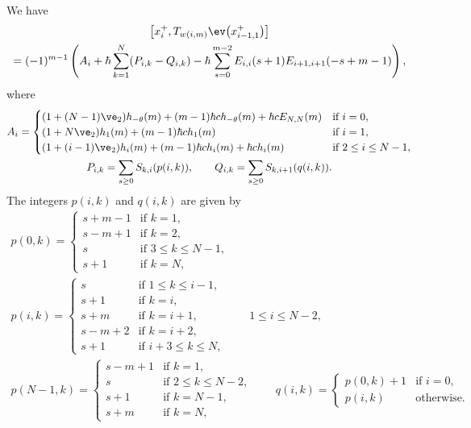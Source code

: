 \begin{prop}\label{prop:braket}
We have
\begin{gather}
\big[x_i^+, T_{w(i,m)} \ev\big(x_{i-1,1}^+\big)\big] \nonumber\\
= (-1)^{m-1} \left(A_i + \hbar \sum_{k=1}^N (P_{i,k}-Q_{i,k}) - \hbar \sum_{s=0}^{m-2} E_{i,i}(s+1)E_{i+1,i+1}(-s+m-1) \right),\label{eq:braket}
\end{gather}
where
\begin{gather*}
A_i = \begin{cases}
(1+(N-1)\ve_2)h_{-\theta}(m) + (m-1)\hbar ch_{-\theta}(m)+ \hbar c E_{N,N}(m) & \text{if $i=0$}, \\
(1+N\ve_2)h_1(m) + (m-1)\hbar ch_{1}(m)& \text{if $i=1$}, \\
(1+(i-1)\ve_2)h_{i}(m) + (m-1)\hbar ch_{i}(m) + \hbar c h_{i}(m) & \text{if $2 \leq i \leq N-1$},
\end{cases}
\\
P_{i,k} = \sum_{s \geq 0} S_{k,i}(p(i,k)), \qquad Q_{i,k} = \sum_{s \geq 0} S_{k,i+1}(q(i,k)).
\end{gather*}
The integers $p(i,k)$ and $q(i,k)$ are given by
\begin{gather*}
p(0,k)= \begin{cases}
s+m-1 & \text{if $k=1$},\\
s-m+1 & \text{if $k=2$},\\
s & \text{if $3 \leq k \leq N-1$},\\
s+1 & \text{if $k=N$},
\end{cases}\\
p(i,k)= \begin{cases}
s & \text{if $1 \leq k \leq i-1$},\\
s+1 & \text{if $k=i$},\\
s+m & \text{if $k=i+1$},\\
s-m+2 & \text{if $k=i+2$},\\
s+1 & \text{if $i+3 \leq k \leq N$},
\end{cases}\qquad 1 \leq i \leq N-2,\\
p(N-1,k)= \begin{cases}
s-m+1 & \text{if $k=1$},\\
s & \text{if $2 \leq k \leq N-2$},\\
s+1 & \text{if $k=N-1$},\\
s+m & \text{if $k=N$},
\end{cases}\qquad
q(i,k)=\begin{cases}
p(0,k)+1 & \text{if $i=0$},\\
p(i,k) &\text{otherwise}.
\end{cases}
\end{gather*}
\end{prop}

